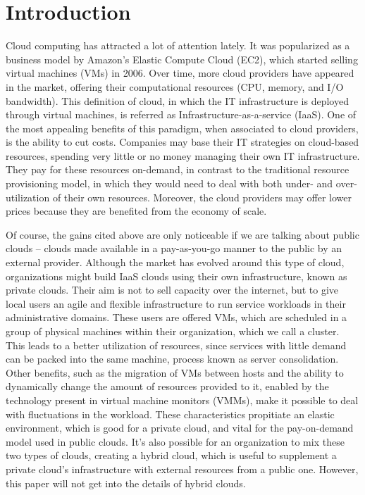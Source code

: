 \chapter{\textbf{Introduction}}

\label{Introduction}

Cloud computing has attracted a lot of attention lately. It was popularized as a business model by Amazon's Elastic Compute Cloud (EC2), which started selling virtual machines (VMs) in 2006. Over time, more cloud providers have appeared in the market, offering their computational resources (CPU, memory, and I/O bandwidth). This definition of cloud, in which the IT infrastructure is deployed through virtual machines, is referred as Infrastructure-as-a-service (IaaS). One of the most appealing benefits of this paradigm, when associated to cloud providers, is the ability to cut costs. Companies may base their IT strategies on cloud-based resources, spending very little or no money managing their own IT infrastructure. They pay for these resources on-demand, in contrast to the traditional resource provisioning model, in which they would need to deal with both under- and over- utilization of their own resources. Moreover, the cloud providers may offer lower prices because they are benefited from the economy of scale.


Of course, the gains cited above are only noticeable if we are talking about public clouds -- clouds made available in a pay-as-you-go manner to the public by an external provider. Although the market has evolved around this type of cloud, organizations might build IaaS clouds using their own infrastructure, known as private clouds. Their aim is not to sell capacity  over the internet,  but to give local users an agile and flexible infrastructure to run service workloads in their administrative domains. These users are offered VMs, which are scheduled in a group of physical machines within their organization, which we call a cluster. This leads to a better utilization of resources, since services with little demand can be packed into the same machine, process known as server consolidation. Other benefits, such as the migration of VMs between hosts and the ability to dynamically change the amount of resources provided to it, enabled by the  technology present in virtual machine monitors (VMMs), make it possible to deal with fluctuations in the workload. These characteristics propitiate an elastic environment, which is good for a private cloud, and vital for the pay-on-demand model used in public clouds.  It's also possible for an organization to mix these two types of clouds, creating a hybrid cloud,  which is useful to supplement a private cloud's infrastructure with external resources from a public one. However, this paper will not get into the details of hybrid clouds. 

